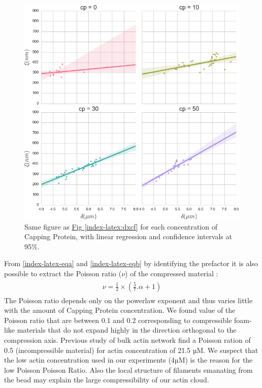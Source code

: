 \documentclass[A4paperpaper,11pt,english]{sphinxmanual}
\begin{document}
\begin{figure}[htbp]
\centering
\capstart

\includegraphics[width=1.000\linewidth]{delta-xi-facets.png}
\caption{Same figure as \hyperref[index-latex:dxcf]{Fig  \ref*{index-latex:dxcf}} for each concentration of Capping Protein,
with linear regression and confidence intervals at 95\%.}\label{index-latex:dxf}\end{figure}

From \eqref{index-latex-eqa} and \eqref{index-latex-eqb} by identifying the prefactor it is also possible
to extract the Poisson ratio (\(\nu\)) of the compressed material :
\label{index-latex:equation-nu=f(alpha)}\begin{gather}
\begin{split}\nu =\frac 1 2 \times \left( \frac 5 7.\alpha +1\right)\end{split}\label{index-latex-nu=f(alpha)}
\end{gather}
The Poisson ratio depends only on the powerlaw exponent and thus varies little
with the amount of Capping Protein concentration.  We found value of the
Poisson ratio that are between 0.1 and 0.2 corresponding to compressible
foam-like materials that do not expand highly in the direction orthogonal to
the compression axis. Previous study of bulk actin network find a Poisson
ration of 0.5 (incompressible material) for actin concentration of 21.5 µM.  We
suspect that the low actin concentration used in our experiments (4µM) is the
reason for the low Poisson Poisson Ratio. Also the local structure of filaments
emanating from the  bead may explain the large compressibility of our actin
cloud.
\end{document}
